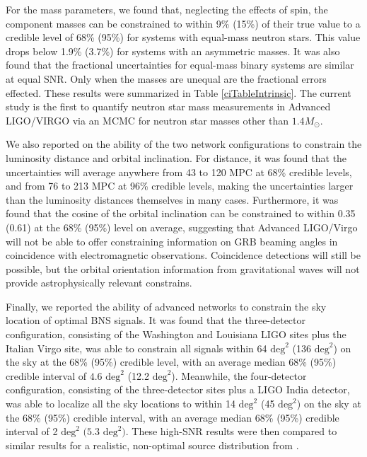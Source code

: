 \documentclass[11pt,a4paper]{emulateapj} 
\newcommand{\carl}[1]{{\color{red} #1}}
\begin{document}
\carl{For the mass parameters,} we found that, neglecting the effects of spin, the component masses can be
constrained to within 9\% (15\%) of their true value to a credible level of
68\% (95\%) \carl{for systems with equal-mass neutron stars.
}  This value drops below 1.9\% (3.7\%) for systems with an asymmetric masses.
  \carl{It was also found that the fractional uncertainties for equal-mass binary systems are similar at equal SNR.
Only when the masses are unequal are the fractional errors effected.}
These results were summarized in Table \ref{ciTableIntrinsic}.  \carl{The current study is the first 
to quantify neutron star mass measurements in Advanced LIGO/VIRGO  via an MCMC for neutron star masses
other than $1.4M_{\odot}$.}


 
We also reported on the ability of the two network configurations to
constrain the luminosity distance and orbital inclination.  For
distance, it was found that the uncertainties will average anywhere from
43 to 120 MPC at 68\% credible levels, and from 76 to 213 MPC at 96\% credible levels,
 making the uncertainties 
larger than the luminosity distances themselves in many cases.  Furthermore, it was
found that the cosine of the orbital inclination can be constrained to
within 0.35 (0.61) at the 68\% (95\%) level on average,
 suggesting that Advanced LIGO/Virgo will not
be able to offer constraining information on GRB beaming angles in coincidence
with electromagnetic observations.  Coincidence detections will still be possible, but
the orbital orientation information from gravitational waves will 
not provide astrophysically relevant constrains.


Finally, we reported the ability of advanced networks to constrain the
sky location of \carl{optimal} BNS signals.  It was found that the three-detector
configuration, consisting of the Washington and Louisiana LIGO sites
plus the Italian Virgo site, was able to constrain all signals within
64 $\mathrm{deg}^2$ (136 $\mathrm{deg}^2$) on the sky at the 68\% (95\%) 
credible level, with
an average median 68\% (95\%) credible interval of 
$4.6$ $\mathrm{deg}^2$ (12.2 $\mathrm{deg}^2$).
Meanwhile, the four-detector configuration, consisting of the
three-detector sites plus a LIGO India detector, was able to localize
all the sky locations to within 14 $\mathrm{deg}^2$ (45 $\mathrm{deg}^2$) on the sky at the 68\% (95\%)
credible interval, with an average median 68\% (95\%) credible interval of 
2 $\mathrm{deg}^2$ $(5.3$ $\mathrm{deg}^2)$.  These high-SNR results
were then compared to similar results for a realistic, non-optimal source distribution from
\cite{Nissanke2013}.
\end{document}
